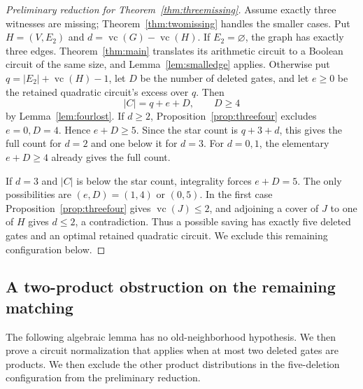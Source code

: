 \documentclass[11pt]{article}
\newcommand{\vc}{\operatorname{vc}}
\theoremstyle{definition}
\theoremstyle{remark}
\begin{document}
\begin{proof}[Preliminary reduction for Theorem~\ref{thm:threemissing}]
Assume exactly three witnesses are missing; Theorem~\ref{thm:twomissing} handles the smaller cases. Put $H=(V,E_2)$ and $d=\vc(G)-\vc(H)$. If $E_2=\varnothing$, the graph has exactly three edges. Theorem~\ref{thm:main} translates its arithmetic circuit to a Boolean circuit of the same size, and Lemma~\ref{lem:smalledge} applies. Otherwise put $q=|E_2|+\vc(H)-1$, let $D$ be the number of deleted gates, and let $e\ge0$ be the retained quadratic circuit's excess over $q$. Then
\[
 |C|=q+e+D,\qquad D\ge4
\]
by Lemma~\ref{lem:fourlost}. If $d\ge2$, Proposition~\ref{prop:threefour} excludes $e=0,D=4$. Hence $e+D\ge5$. Since the star count is $q+3+d$, this gives the full count for $d=2$ and one below it for $d=3$. For $d=0,1$, the elementary $e+D\ge4$ already gives the full count.

If $d=3$ and $|C|$ is below the star count, integrality forces $e+D=5$. The only possibilities are $(e,D)=(1,4)$ or $(0,5)$. In the first case Proposition~\ref{prop:threefour} gives $\vc(J)\le2$, and adjoining a cover of $J$ to one of $H$ gives $d\le2$, a contradiction. Thus a possible saving has exactly five deleted gates and an optimal retained quadratic circuit. We exclude this remaining configuration below.
\end{proof}

\subsection{A two-product obstruction on the remaining matching}

The following algebraic lemma has no old-neighborhood hypothesis. We then prove a circuit normalization that applies when at most two deleted gates are products. We then exclude the other product distributions in the five-deletion configuration from the preliminary reduction.
\end{document}
